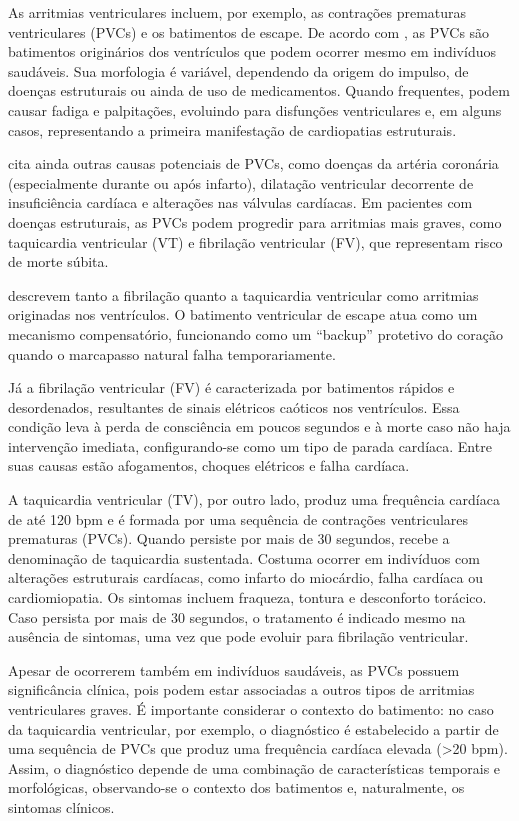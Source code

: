 As arritmias ventriculares incluem, por exemplo, as contrações prematuras ventriculares (PVCs) e os batimentos de escape. De acordo com , as PVCs são batimentos originários dos ventrículos que podem ocorrer mesmo em indivíduos saudáveis. Sua morfologia é variável, dependendo da origem do impulso, de doenças estruturais ou ainda de uso de medicamentos. Quando frequentes, podem causar fadiga e palpitações, evoluindo para disfunções ventriculares e, em alguns casos, representando a primeira manifestação de cardiopatias estruturais.

 cita ainda outras causas potenciais de PVCs, como doenças da artéria coronária (especialmente durante ou após infarto), dilatação ventricular decorrente de insuficiência cardíaca e alterações nas válvulas cardíacas. Em pacientes com doenças estruturais, as PVCs podem progredir para arritmias mais graves, como taquicardia ventricular (VT) e fibrilação ventricular (FV), que representam risco de morte súbita.

 descrevem tanto a fibrilação quanto a taquicardia ventricular como arritmias originadas nos ventrículos.
O batimento ventricular de escape atua como um mecanismo compensatório, funcionando como um “backup” protetivo do coração quando o marcapasso natural falha temporariamente.

Já a fibrilação ventricular (FV) é caracterizada por batimentos rápidos e desordenados, resultantes de sinais elétricos caóticos nos ventrículos. Essa condição leva à perda de consciência em poucos segundos e à morte caso não haja intervenção imediata, configurando-se como um tipo de parada cardíaca. Entre suas causas estão afogamentos, choques elétricos e falha cardíaca.

A taquicardia ventricular (TV), por outro lado, produz uma frequência cardíaca de até 120 bpm e é formada por uma sequência de contrações ventriculares prematuras (PVCs). Quando persiste por mais de 30 segundos, recebe a denominação de taquicardia sustentada. Costuma ocorrer em indivíduos com alterações estruturais cardíacas, como infarto do miocárdio, falha cardíaca ou cardiomiopatia. Os sintomas incluem fraqueza, tontura e desconforto torácico. Caso persista por mais de 30 segundos, o tratamento é indicado mesmo na ausência de sintomas, uma vez que pode evoluir para fibrilação ventricular.

Apesar de ocorrerem também em indivíduos saudáveis, as PVCs possuem significância clínica, pois podem estar associadas a outros tipos de arritmias ventriculares graves. É importante considerar o contexto do batimento: no caso da taquicardia ventricular, por exemplo, o diagnóstico é estabelecido a partir de uma sequência de PVCs que produz uma frequência cardíaca elevada (>20 bpm). Assim, o diagnóstico depende de uma combinação de características temporais e morfológicas, observando-se o contexto dos batimentos e, naturalmente, os sintomas clínicos.

